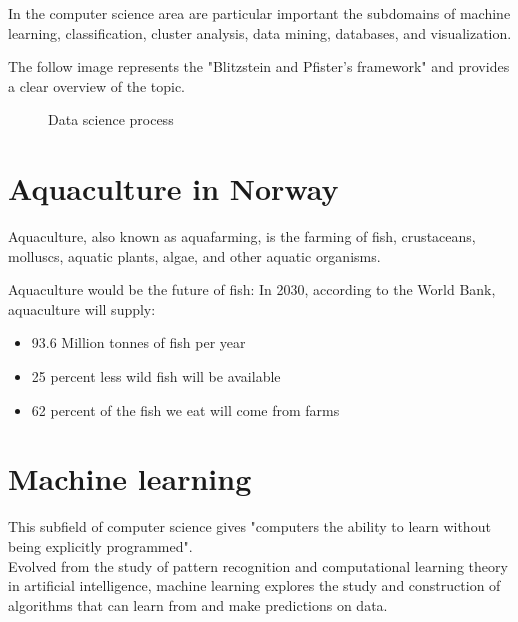 In the computer science area are particular important the subdomains of machine learning, classification, cluster analysis, data mining, databases, and visualization.

The follow image represents the "Blitzstein and Pfister's framework" and provides a clear overview of the topic.

\begin{figure}[h]
    \centering
    \caption[Data science process]{Data science process}
    \label{fig: Data_science}
\end{figure}



\newpage

\section{Aquaculture in Norway}
Aquaculture, also known as aquafarming, is the farming of fish, crustaceans, molluscs, aquatic plants, algae, and other aquatic organisms.

Aquaculture would be the future of fish:
In 2030, according to the World Bank, aquaculture will supply:
\begin{itemize}
\item 93.6 Million tonnes of fish per year
\item 25 percent less wild fish will be available
\item 62 percent of the fish we eat will come from farms
\end{itemize}

\newpage

\section{Machine learning}
This subfield of computer science gives "computers the ability to learn without being explicitly programmed". \\Evolved from the study of pattern recognition and computational learning theory in artificial intelligence, machine learning explores the study and construction of algorithms that can learn from and make predictions on data.

